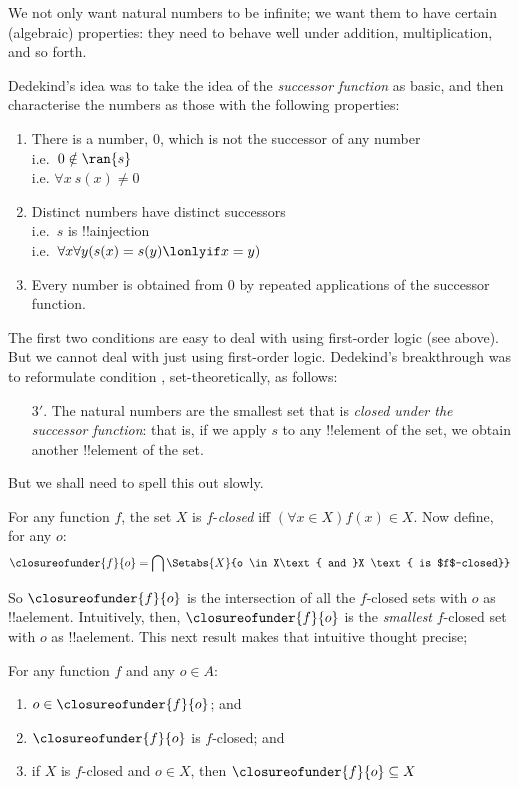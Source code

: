 \documentclass[../../../include/open-logic-section]{subfiles}
\begin{document}
	
	
We not only want natural numbers to be infinite; we want them to have certain (algebraic) properties: they need to behave well under addition, multiplication, and so forth. 

Dedekind's idea was to take the idea of the \emph{successor function} as basic, and then characterise the numbers as those with the following properties:
\begin{enumerate}
	\item There is a number, $0$, which is not the successor of any number
	\\i.e.\ $0 \notin \ran{s}$
	\\i.e. $\forall x\ s(x) \neq 0$
	\item Distinct numbers have distinct successors 
	\\i.e.\ $s$ is !!a{injection}
	\\i.e.\ $\forall x \forall y (s(x) = s(y) \lonlyif x = y)$
	\item{} Every number is obtained from $0$ by repeated applications of the successor function.
\end{enumerate}
The first two conditions are easy to deal with using first-order logic (see above). But we cannot deal with  just using first-order logic. Dedekind's breakthrough was to reformulate condition , set-theoretically, as follows:
\begin{enumerate}
	\item[3$'$.] The natural numbers are the smallest set that is \emph{closed under the successor function}: that is, if we apply $s$ to any !!{element} of the set, we obtain another !!{element} of the set.
\end{enumerate}
But we shall need to spell this out slowly.
\begin{defn}
	For any function $f$, the set $X$ is $f$-\emph{closed} {iff} $(\forall x \in X)f(x) \in X$. Now define, for any $o$:
	$$\closureofunder{f}{o} = \bigcap\Setabs{X}{o \in X\text{ and }X \text{ is $f$-closed}}$$
\end{defn}\noindent 
So $\closureofunder{f}{o}$ is the intersection of all the $f$-closed sets with $o$ as !!a{element}. Intuitively, then, $\closureofunder{f}{o}$ is the \emph{smallest} $f$-closed set with $o$ as !!a{element}. This next result makes that intuitive thought precise;
\begin{lem}
	For any function $f$ and any $o \in A$:
	\begin{enumerate}
		\item{} $o \in \closureofunder{f}{o}$; and
		\item{} $\closureofunder{f}{o}$ is $f$-closed; and
		\item{} if $X$ is $f$-closed and $o \in X$, then $\closureofunder{f}{o} \subseteq X$
	\end{enumerate}
\end{lem}
\end{document}
